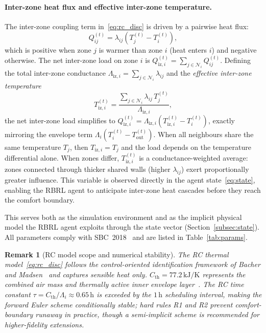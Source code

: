 \documentclass[12pt,a4paper]{article}
\newtheorem{remark}{Remark}
\newcommand{\Tout}{T_{\mathrm{out}}}
\newcommand{\Cth}{C_{\mathrm{th}}}
\newcommand{\lij}{\lambda_{ij}}
\newcommand{\Liz}[1]{\Lambda_{\mathrm{iz},#1}}
\newcommand{\Tiz}[1]{T_{\mathrm{iz},#1}}
\newcommand{\Qiz}[1]{Q_{\mathrm{iz},#1}}
\begin{document}
\paragraph{Inter-zone heat flux and effective inter-zone temperature.}
The inter-zone coupling term in~\eqref{eq:rc_disc} is driven by a
pairwise heat flux:
\begin{equation}
  Q_{ij}^{(t)} = \lij\!\left(T_j^{(t)}-T_i^{(t)}\right),
  \label{eq:qij}
\end{equation}
which is positive when zone $j$ is warmer than zone $i$ (heat enters $i$)
and negative otherwise.
The net inter-zone load on zone $i$ is
$\Qiz{i}^{(t)}=\sum_{j\in\mathcal{N}_i}Q_{ij}^{(t)}$.
Defining the total inter-zone conductance
$\Liz{i}=\sum_{j\in\mathcal{N}_i}\lij$ and the
\emph{effective inter-zone temperature}
\begin{equation}
  \Tiz{i}^{(t)}
  =\frac{\displaystyle\sum_{j\in\mathcal{N}_i}\lij\,T_j^{(t)}}{\Liz{i}},
  \label{eq:tiz}
\end{equation}
the net inter-zone load simplifies to
$\Qiz{i}^{(t)}=\Liz{i}\!\left(\Tiz{i}^{(t)}-T_i^{(t)}\right)$,
exactly mirroring the envelope term $\Lambda_i(T_i^{(t)}-\Tout^{(t)})$.
When all neighbours share the same temperature $T_j$, then $\Tiz{i}=T_j$
and the load depends on the temperature differential alone.
When zones differ, $\Tiz{i}^{(t)}$ is a conductance-weighted average:
zones connected through thicker shared walls (higher $\lij$) exert
proportionally greater influence.
This variable is observed directly in the agent state~\eqref{eq:state},
enabling the RBRL agent to anticipate inter-zone heat cascades before
they reach the comfort boundary.

This serves both as the simulation environment and as the implicit
physical model the RBRL agent exploits through the state vector
(Section~\ref{subsec:state}).
All parameters comply with SBC~2018~\cite{Alayed2021} and are listed
in Table~\ref{tab:params}.

\begin{remark}[RC model scope and numerical stability]
\label{rem:rc}
The RC thermal model~\eqref{eq:rc_disc} follows the control-oriented
identification framework of Bacher and Madsen~\cite{Bacher2011} and
captures sensible heat only.
$\Cth=77.2\,\text{kJ/K}$ represents the combined air mass and thermally
active inner envelope layer~\cite{Zamani2024}.
The RC time constant $\tau=\Cth/\Lambda_i\approx0.65\,\text{h}$ is
exceeded by the $1\,\text{h}$ scheduling interval, making the forward
Euler scheme conditionally stable; hard rules R1 and R2 prevent
comfort-boundary runaway in practice, though a semi-implicit scheme
is recommended for higher-fidelity extensions.
\end{remark}
\end{document}
